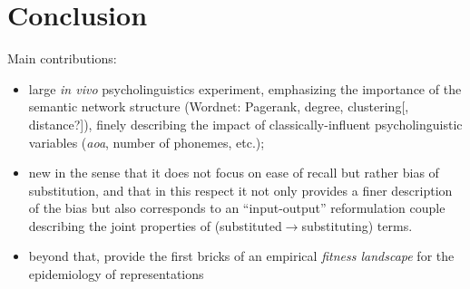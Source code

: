 \section{Conclusion}\label{sec:conclusion}

Main contributions:
\begin{itemize}
\item large \emph{in vivo} psycholinguistics experiment, emphasizing the importance of the semantic network structure (Wordnet: Pagerank, degree, clustering[, distance?]), finely describing the impact of classically-influent psycholinguistic variables (\emph{aoa}, number of phonemes, etc.); 
\item new in the sense that it does not focus on ease of recall but rather bias of substitution, and that in this respect it not only provides a finer description of the bias but also corresponds to an  ``input-output'' reformulation couple describing the joint properties of (substituted$\rightarrow$substituting) terms.
\item beyond that, provide the first bricks of an empirical \emph{fitness landscape} for the epidemiology of representations
\end{itemize}